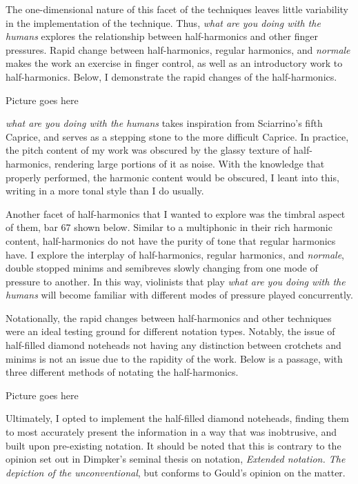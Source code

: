The one-dimensional nature of this facet of the techniques leaves little variability in the implementation of the technique. 
Thus, \emph{what are you doing with the humans} explores the relationship between half-harmonics and other finger pressures. 
Rapid change between half-harmonics, regular harmonics, and \emph{normale} makes the work an exercise in finger control, as well as an introductory work to half-harmonics.
Below, I demonstrate the rapid changes of the half-harmonics.

Picture goes here

\emph{what are you doing with the humans} takes inspiration from Sciarrino's fifth Caprice, and serves as a stepping stone to the more difficult Caprice.\autocite[]{sciarrinoCapricciViolino1976} 
In practice, the pitch content of my work was obscured by the glassy texture of half-harmonics, rendering large portions of it as noise. 
With the knowledge that properly performed, the harmonic content would be obscured, I leant into this, writing in a more tonal style than I do usually.


Another facet of half-harmonics that I wanted to explore was the timbral aspect of them, bar 67 shown below.
Similar to a multiphonic in their rich harmonic content, half-harmonics do not have the purity of tone that regular harmonics have.
I explore the interplay of half-harmonics, regular harmonics, and \emph{normale}, double stopped minims and semibreves slowly changing from one mode of pressure to another.
In this way, violinists that play \emph{what are you doing with the humans} will become familiar with different modes of pressure played concurrently.

Notationally, the rapid changes between half-harmonics and other techniques were an ideal testing ground for different notation types. 
Notably, the issue of half-filled diamond noteheads not having any distinction between crotchets and minims is not an issue due to the rapidity of the work.
Below is a passage, with three different methods of notating the half-harmonics.

Picture goes here

Ultimately, I opted to implement the half-filled diamond noteheads, finding them to most accurately present the information in a way that was inobtrusive, and built upon pre-existing notation.
It should be noted that this is contrary to the opinion set out in Dimpker's seminal thesis on notation, \emph{Extended notation. The depiction of the
unconventional}, but conforms to Gould's opinion on the matter.\autocites[120-121]{dimpkerExtendedNotationDepiction2012}[61]{gouldBars2011}

